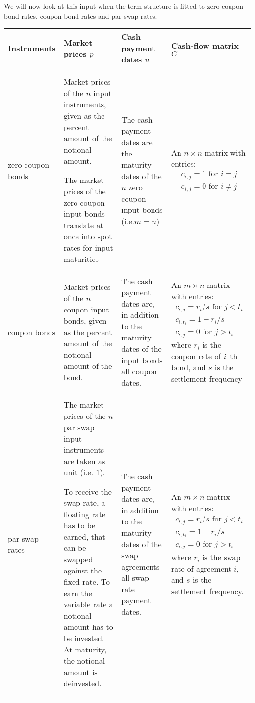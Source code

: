 \documentclass[10pt]{article}
\theoremstyle{definition}
\theoremstyle{remark}
\theoremstyle{plain}
\begin{document}
We will now look at this input when the term structure is fitted to zero coupon
bond rates, coupon bond rates and par swap rates.

\begin{tabular}{|p{1.7cm}|p{4cm}|p{3cm}|p{4cm}|}
\hline
Instruments & Market prices $p$ & Cash payment dates $u$  & Cash-flow matrix $C$ \\
\hline
zero coupon bonds 
& 
Market prices of the $n$ input instruments, given as the percent amount of the notional amount.

The market prices of the zero coupon input bonds translate at once into spot rates for input maturities
& 
The cash payment dates are the maturity dates of the $n$ zero coupon input bonds (i.e.$m=n$)
& 
An $n\times n$ matrix with entries:
\begin{align*}
c_{i,j} = 1 \text{ for } i=j \\
c_{i,j} = 0 \text{ for } i\neq j 
\end{align*}
\\
\hline
coupon bonds
&
Market prices of the $n$ coupon input bonds, given as the percent amount of the notional amount of the bond.
&
The cash payment dates are, in addition to the maturity dates of the input bonds all coupon dates.
&
An $m\times n$ matrix with entries:
\begin{align*}
c_{i,j} = r_i/s \text{ for } j<t_i \\
c_{i,t_i} = 1+ r_i/s  \\
c_{i,j} = 0 \text{ for } j>t_i
\end{align*}
where $r_i$ is the coupon rate of $i$~th bond, and $s$ is the settlement frequency
\\
\hline
par swap rates
&
The market prices of the $n$ par swap input instruments are taken as unit (i.e. $1$).

To receive the swap rate, a floating rate has to be earned, that can be swapped against the fixed rate. To earn the variable rate a notional amount has to be invested. At maturity, the notional amount is deinvested.
&
The cash payment dates are, in addition to the maturity dates of the swap agreements all swap rate payment dates.
&
An $m\times n$ matrix with entries:
\begin{align*}
c_{i,j} = r_i/s \text{ for } j<t_i \\
c_{i,t_i} = 1+ r_i/s  \\
c_{i,j} = 0 \text{ for } j>t_i
\end{align*}
where $r_i$ is the swap rate of agreement $i$, and $s$ is the settlement frequency.
\\
\hline
\end{tabular}
\end{document}
